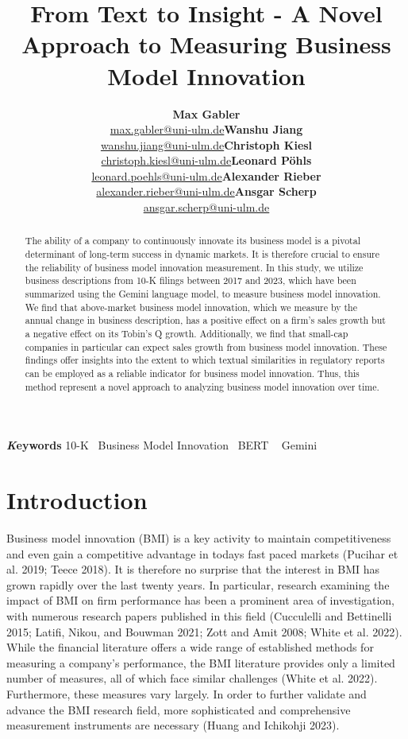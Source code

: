 \documentclass[
]{article}
\title{From Text to Insight - A Novel Approach to Measuring Business
Model Innovation}
\author{\textbf{Max
Gabler}\\\href{mailto:max.gabler@uni-ulm.de}{max.gabler@uni-ulm.de}\asep\textbf{Wanshu
Jiang}\\\href{mailto:wanshu.jiang@uni-ulm.de}{wanshu.jiang@uni-ulm.de}\asep\textbf{Christoph
Kiesl}\\\href{mailto:christoph.kiesl@uni-ulm.de}{christoph.kiesl@uni-ulm.de}\asep\textbf{Leonard
Pöhls}\\\href{mailto:leonard.poehls@uni-ulm.de}{leonard.poehls@uni-ulm.de}\asep\textbf{Alexander
Rieber}\\\href{mailto:alexander.rieber@uni-ulm.de}{alexander.rieber@uni-ulm.de}\asep\textbf{Ansgar
Scherp}\\\href{mailto:ansgar.scherp@uni-ulm.de}{ansgar.scherp@uni-ulm.de}}
\date{}
\begin{document}
\maketitle
\begin{abstract}
The ability of a company to continuously innovate its business model is
a pivotal determinant of long-term success in dynamic markets. It is
therefore crucial to ensure the reliability of business model innovation
measurement. In this study, we utilize business descriptions from 10-K
filings between 2017 and 2023, which have been summarized using the
Gemini language model, to measure business model innovation. We find
that above-market business model innovation, which we measure by the
annual change in business description, has a positive effect on a firm's
sales growth but a negative effect on its Tobin's Q growth.
Additionally, we find that small-cap companies in particular can expect
sales growth from business model innovation. These findings offer
insights into the extent to which textual similarities in regulatory
reports can be employed as a reliable indicator for business model
innovation. Thus, this method represent a novel approach to analyzing
business model innovation over time.
\end{abstract}
{\bfseries \emph Keywords}
\def\sep{\textbullet\ }
10-K \sep Business Model Innovation \sep BERT \sep 
Gemini


\newpage{}

\section{Introduction}\label{introduction}

Business model innovation (BMI) is a key activity to maintain
competitiveness and even gain a competitive advantage in todays fast
paced markets (Pucihar et al. 2019; Teece 2018). It is therefore no
surprise that the interest in BMI has grown rapidly over the last twenty
years. In particular, research examining the impact of BMI on firm
performance has been a prominent area of investigation, with numerous
research papers published in this field (Cucculelli and Bettinelli 2015;
Latifi, Nikou, and Bouwman 2021; Zott and Amit 2008; White et al. 2022).
While the financial literature offers a wide range of established
methods for measuring a company's performance, the BMI literature
provides only a limited number of measures, all of which face similar
challenges (White et al. 2022). Furthermore, these measures vary
largely. In order to further validate and advance the BMI research
field, more sophisticated and comprehensive measurement instruments are
necessary (Huang and Ichikohji 2023).
\end{document}
